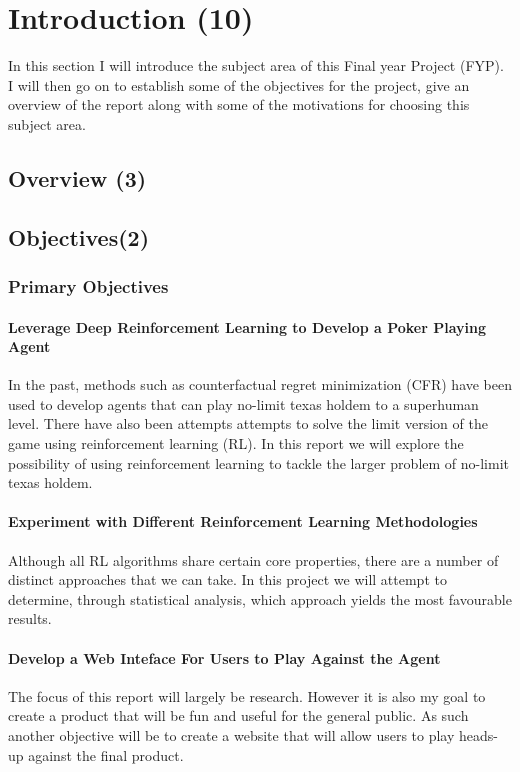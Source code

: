 \chapter{Introduction (10)}
In this section I will introduce the subject area of this Final year Project (FYP). I will then go on to establish some of the objectives for the project, give an overview of the report along with some of the motivations for choosing this subject area. 

\section{Overview (3)}


\section{Objectives(2)}
\subsection{Primary Objectives}
\subsubsection{Leverage Deep Reinforcement Learning to Develop a Poker Playing Agent}
In the past, methods such as counterfactual regret minimization (CFR) have been used to develop agents that can play no-limit texas holdem to a superhuman level. There have also been attempts attempts to solve the limit version of the game using reinforcement learning (RL). In this report we will explore the possibility of using reinforcement learning to tackle the larger problem of no-limit texas holdem.

\subsubsection{Experiment with Different Reinforcement Learning Methodologies}
Although all RL algorithms share certain core properties, there are a number of distinct approaches that we can take. In this project we will attempt to determine, through statistical analysis, which approach yields the most favourable results. 

\subsubsection{Develop a Web Inteface For Users to Play Against the Agent}
The focus of this report will largely be research. However it is also my goal to create a product that will be fun and useful for the general public. As such another objective will be to create a website that will allow users to play heads-up against the final product.

